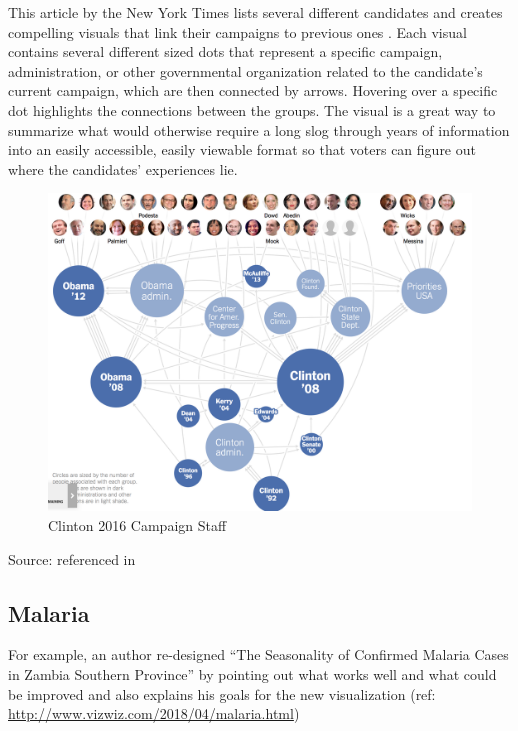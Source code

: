 \documentclass[]{book}
\theoremstyle{definition}
\theoremstyle{definition}
\theoremstyle{definition}
\theoremstyle{remark}
\begin{document}
This article by the New York Times lists several different candidates
and creates compelling visuals that link their campaigns to previous
ones \citep{campaign_staff}\citep{cool_data}. Each visual contains
several different sized dots that represent a specific campaign,
administration, or other governmental organization related to the
candidate's current campaign, which are then connected by arrows.
Hovering over a specific dot highlights the connections between the
groups. The visual is a great way to summarize what would otherwise
require a long slog through years of information into an easily
accessible, easily viewable format so that voters can figure out where
the candidates' experiences lie.

\begin{figure}
\centering
\includegraphics{images/clinton_campaign.png}
\caption{Clinton 2016 Campaign Staff}
\end{figure}

Source: \citep{campaign_staff} referenced in \citep{cool_data}

\subsection{Malaria}\label{malaria}

For example, an author re-designed ``The Seasonality of Confirmed
Malaria Cases in Zambia Southern Province'' by pointing out what works
well and what could be improved and also explains his goals for the new
visualization (ref:
\url{http://www.vizwiz.com/2018/04/malaria.html})\citep{vizwiz_malaria}
\end{document}
